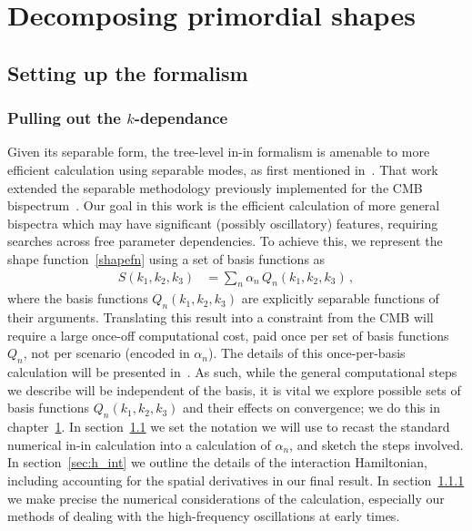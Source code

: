 %
\chapter{Decomposing primordial shapes}\label{chapter:decomp}
\section{Setting up the formalism}\label{sec:setting_notation}
    \subsection{Pulling out the $k$-dependance}\label{sec:k_dep}
    Given its separable form, the tree-level in-in formalism is amenable
to more efficient calculation using separable modes, as first mentioned in~\cite{Funakoshi}.
That work extended the separable methodology previously implemented for the CMB bispectrum~\cite{FergShell_3}.
Our goal in this work is the efficient calculation of more general bispectra
which may have significant (possibly oscillatory) features, requiring searches across free parameter dependencies.
To achieve this, we represent the shape function~\eqref{shapefn} using a set of basis functions as
\begin{align}\label{goal}
S(k_1, k_2,k_3) &= \sum_n \alpha_n  \, Q_n(k_1,k_2,k_3)\,,
\end{align}
where the basis functions $Q_n(k_1,k_2,k_3)$ are explicitly separable functions of their arguments.
Translating this result into a constraint from the CMB
will require a large once-off computational cost, paid once
per set of basis functions $Q_n$,
not per scenario (encoded in $\alpha_n$).
The details of this once-per-basis calculation will be
presented in~\cite{Sohn_2021}.
As such, while the general computational steps we
describe will be independent of the basis, it is vital we
explore possible sets of basis functions $Q_n(k_1,k_2,k_3)$
and their effects on convergence;
we do this in chapter~\ref{chapter:decomp}.
In section~\ref{sec:setting_notation} we set the notation we will use to recast
the standard numerical in-in calculation into a calculation of $\alpha_n$,
and sketch the steps involved.
In section~\ref{sec:h_int} we outline the details of the interaction Hamiltonian,
including accounting for the spatial derivatives in our final result.
In section~\ref{sec:k_dep} we make precise the numerical considerations
of the calculation,
especially our methods of dealing with the high-frequency
oscillations at early times.

